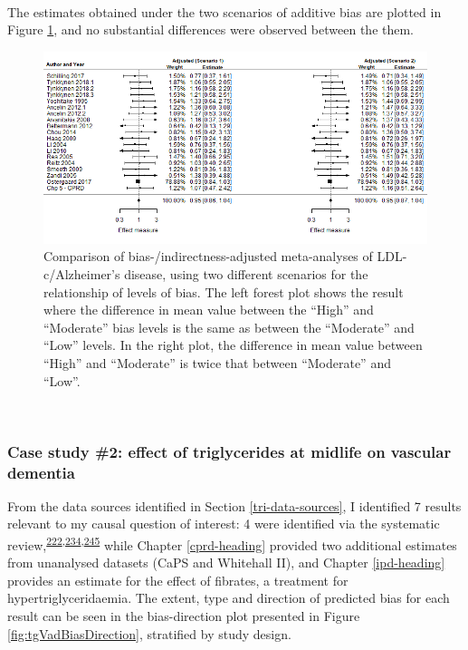 \documentclass[a4paper, twoside]{templates/ociamthesis}
\begin{document}
~

The estimates obtained under the two scenarios of additive bias are plotted in Figure \ref{fig:fpLdlAdComparison}, and no substantial differences were observed between the them.





\begin{figure}[H]
\includegraphics[width=1\linewidth]{figures/tri/fp_paired_midlife_ldl_ad_scenarios} \caption[Comparison of bias-/indirectness-adjusted meta-analyses under two different scenarios of prior distributions of bias.]{Comparison of bias-/indirectness-adjusted meta-analyses of LDL-c/Alzheimer's disease, using two different scenarios for the relationship of levels of bias. The left forest plot shows the result where the difference in mean value between the ``High'' and ``Moderate'' bias levels is the same as between the ``Moderate'' and ``Low'' levels. In the right plot, the difference in mean value between ``High'' and ``Moderate'' is twice that between ``Moderate'' and ``Low''.}\label{fig:fpLdlAdComparison}
\end{figure}

~

\hypertarget{case-study-2-effect-of-triglycerides-at-midlife-on-vascular-dementia}{%
\subsubsection{Case study \#2: effect of triglycerides at midlife on vascular dementia}\label{case-study-2-effect-of-triglycerides-at-midlife-on-vascular-dementia}}

From the data sources identified in Section \ref{tri-data-sources}, I identified 7 results relevant to my causal question of interest: 4 were identified via the systematic review,\textsuperscript{\protect\hyperlink{ref-forti2010}{222},\protect\hyperlink{ref-raffaitin2009}{234},\protect\hyperlink{ref-yoshitake1995}{245}} while Chapter \ref{cprd-heading} provided two additional estimates from unanalysed datasets (CaPS and Whitehall II), and Chapter \ref{ipd-heading} provides an estimate for the effect of fibrates, a treatment for hypertriglyceridaemia. The extent, type and direction of predicted bias for each result can be seen in the bias-direction plot presented in Figure \ref{fig:tgVadBiasDirection}, stratified by study design.
\end{document}
